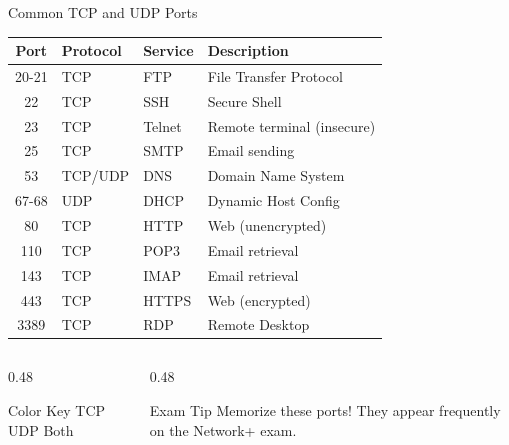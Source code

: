 \documentclass[aspectratio=169]{beamer}  %
\begin{document}
\begin{frame}{Common TCP and UDP Ports}
    \begin{center}
        \small
        \begin{tabular}{c l l l}
            \toprule
            \textbf{Port} & \textbf{Protocol} & \textbf{Service} & \textbf{Description} \\
            \midrule
            \rowcolor{tcpblue!10} 20-21 & TCP & FTP & File Transfer Protocol \\
            \rowcolor{tcpblue!10} 22 & TCP & SSH & Secure Shell \\
            \rowcolor{tcpblue!10} 23 & TCP & Telnet & Remote terminal (insecure) \\
            \rowcolor{tcpblue!10} 25 & TCP & SMTP & Email sending \\
            \rowcolor{udpgreen!15} 53 & TCP/UDP & DNS & Domain Name System \\
            \rowcolor{udpgreen!10} 67-68 & UDP & DHCP & Dynamic Host Config \\
            \rowcolor{tcpblue!10} 80 & TCP & HTTP & Web (unencrypted) \\
            \rowcolor{tcpblue!10} 110 & TCP & POP3 & Email retrieval \\
            \rowcolor{tcpblue!10} 143 & TCP & IMAP & Email retrieval \\
            \rowcolor{tcpblue!10} 443 & TCP & HTTPS & Web (encrypted) \\
            \rowcolor{tcpblue!10} 3389 & TCP & RDP & Remote Desktop \\
            \bottomrule
        \end{tabular}
    \end{center}
    
    \vspace{0.3em}
    \begin{columns}[T]
        \begin{column}{0.48\textwidth}
            \begin{block}{Color Key}
                \small
                \colorbox{tcpblue!10}{TCP} \quad \colorbox{udpgreen!10}{UDP} \quad \colorbox{udpgreen!15}{Both}
            \end{block}
        \end{column}
        \begin{column}{0.48\textwidth}
            \begin{alertblock}{Exam Tip}
                \small
                Memorize these ports! They appear frequently on the Network+ exam.
            \end{alertblock}
        \end{column}
    \end{columns}
\end{frame}
\end{document}
